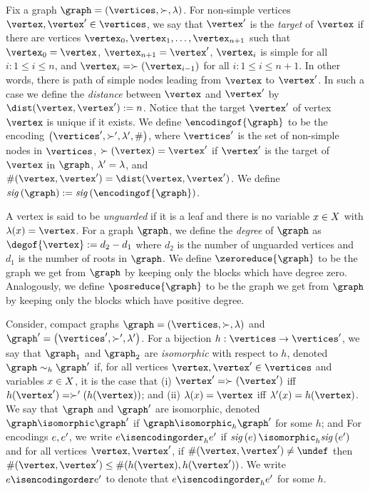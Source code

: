 Fix a graph $\graph=\tuple{\vertices,\succ,\labeling}$.
%
For non-simple vertices $\vertex,\vertex'\in\vertices$, we say that
$\vertex'$ is the {\it target} of $\vertex$ if there are
vertices $\vertex_0,\vertex_1,\ldots,\vertex_{n+1}$ such that
$\vertex_0=\vertex$, $\vertex_{n+1}=\vertex'$, $\vertex_i$ is simple for all $i:1\leq i\leq n$, and
$\vertex_i=\succ(\vertex_{i-1})$ for all $i:1\leq i\leq n+1$.
%
In other words, there is path of simple nodes leading from $\vertex$ to $\vertex'$.
%
In such a case we define the {\it distance} between $\vertex$ and $\vertex'$ by
$\dist(\vertex,\vertex'):=n$.
%
Notice that the target $\vertex'$ of vertex $\vertex$ is unique if it exists.
%
We define $\encodingof{\graph}$ to be the encoding
$\tuple{\vertices',\succ',\labeling',\cnt}$, where
$\vertices'$ is the set of non-simple nodes in $\vertices$,
$\succ(\vertex)=\vertex'$ if $\vertex'$ is the target of $\vertex$ in $\graph$,
$\lambda'=\lambda$, and
$\cnt(\vertex,\vertex')=\dist(\vertex,\vertex')$.
%
We define $\sigof{\graph}:=\sigof{\encodingof{\graph}}$.


A vertex is said to be {\it unguarded} if it is a leaf and there is no
variable $x\in X$ with $\labeling(\xvar)=\vertex$.
%
For a graph $\graph$,
we define the {\it degree} of $\graph$ as
$\degof{\vertex}:=d_2-d_1$ where $d_2$ is the number of unguarded vertices and
$d_1$ is the number of roots in $\graph$.
%
We define $\zeroreduce{\graph}$ to be the graph
we get from $\graph$ by keeping only the blocks
which have degree zero.
%
Analogously, we define $\posreduce{\graph}$ to be the graph
we get from $\graph$ by keeping only the blocks
which have positive degree.
%

Consider, compact graphs $\graph=\tuple{\vertices,\succ,\labeling}$ and 
$\graph'=\tuple{\vertices',\succ',\labeling'}$.
%
For a bijection
$h:\vertices\rightarrow\vertices'$, we say that $\graph_1$ and $\graph_2$ are {\it isomorphic}
with respect to $h$, denoted $\graph\sim_h\graph'$
if, for all vertices $\vertex,\vertex'\in\vertices$ and variables $x\in X$,
it is the case that
(i) $\vertex'=\succ(\vertex')$ iff $h(\vertex')=\succ'(h(\vertex))$; and
(ii) $\labeling(\xvar)=\vertex$ iff $\labeling'(\xvar)=h(\vertex)$.
%
We say that $\graph$ and $\graph'$ are isomorphic, denoted $\graph\isomorphic\graph'$
if $\graph\isomorphic_h\graph'$ for some $h$; and
%
For encodings $e,e'$, we write $\encoding\isencodingorder_h\encoding'$ if 
$\sigof{\encoding}\isomorphic_h\sigof{\encoding'}$ and for all vertices $\vertex,\vertex'$,
if $\cnt(\vertex,\vertex')\neq\undef$ then  $\cnt(\vertex,\vertex')\leq\cnt(h(\vertex),h(\vertex'))$.
%
We write $\encoding\isencodingorder\encoding'$ to denote that
$\encoding\isencodingorder_h\encoding'$ for some $h$.

